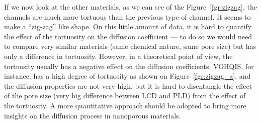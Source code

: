 \documentclass[main]{subfiles}
\begin{document}
If we now look at the other materials, as we can see of the Figure~\ref{fgr:zigzag}, the channels are much more tortuous than the previous type of channel. It seems to make a ``zig-zag'' like shape. On this little amount of data, it is hard to quantify the effect of the tortuosity on the diffusion coefficient --- to do so we would need to compare very similar materials (same chemical nature, same pore size) but has only a difference in tortuosity. However, in a theoretical point of view, the tortuosity usually has a negative effect on the diffusion coefficients. VOHQIS, for instance, has a high degree of tortuosity as shown on Figure~\ref{fgr:zigzag_a}, and the diffusion properties are not very high, but it is hard to disentangle the effect of the pore size (very big difference between LCD and PLD) from the effect of the tortuosity. A more quantitative approach should be adopted to bring more insights on the diffusion process in nanoporous materials. 
\end{document}

